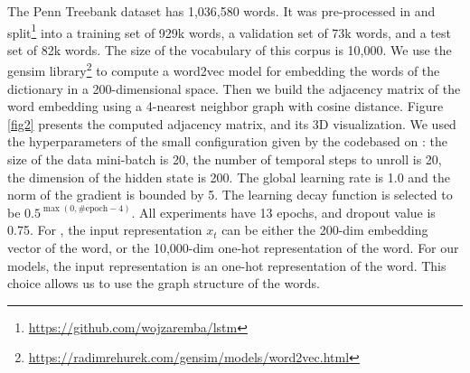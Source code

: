 \documentclass{article} %
\begin{document}
The Penn Treebank dataset has 1,036,580 words. It was pre-processed in \cite{zaremba2014recurrent} and split\footnote{\url{https://github.com/wojzaremba/lstm}} into a training set of 929k words, a validation set of 73k words, and a test set of 82k words. The size of the vocabulary of this corpus is 10,000. We use the gensim library\footnote{\url{https://radimrehurek.com/gensim/models/word2vec.html}} to compute a word2vec model \citep{word2vec} for embedding the words of the dictionary in a 200-dimensional space. Then we build the adjacency matrix of the word embedding using a 4-nearest neighbor graph with cosine distance. Figure \ref{fig2} presents the computed adjacency matrix, and its 3D visualization. We used the hyperparameters of the small configuration given by the code\footnotemark[5] based on \cite{zaremba2014recurrent}: the size of the data mini-batch is 20, the number of temporal steps to unroll is 20, the dimension of the hidden state is 200. The global learning rate is 1.0 and the norm of the gradient is bounded by 5. The learning decay function is selected to be $0.5^{\max(0,\textrm{\#epoch}-4)}$. All experiments have 13 epochs, and dropout value is 0.75. For \cite{zaremba2014recurrent}, the input representation $x_t$ can be either the 200-dim embedding vector of the word, or the 10,000-dim one-hot representation of the word. For our models, the input representation is an one-hot representation of the word. This choice allows us to use the graph structure of the words. 
\end{document}
